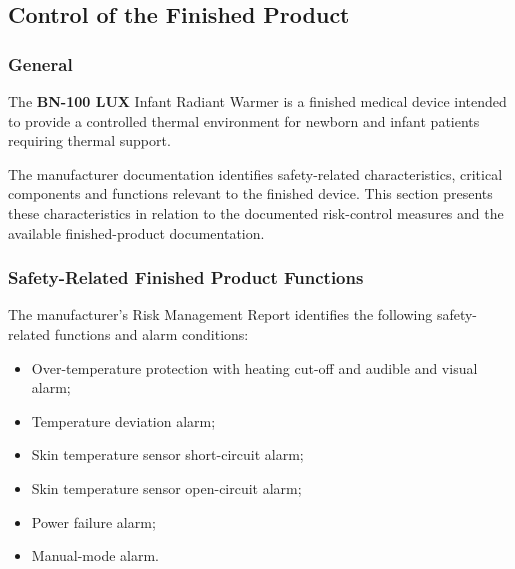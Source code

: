 
\hypertarget{p3-3-4}{}

\subsection{Control of the Finished Product}

\subsubsection{General}

The \textbf{BN-100 LUX} Infant Radiant Warmer is a finished
medical device intended to provide a controlled thermal
environment for newborn and infant patients requiring thermal
support.

The manufacturer documentation identifies safety-related
characteristics, critical components and functions relevant to
the finished device. This section presents these characteristics
in relation to the documented risk-control measures and the
available finished-product documentation.


\subsubsection{Safety-Related Finished Product Functions}

The manufacturer's Risk Management Report identifies the
following safety-related functions and alarm conditions:

\begin{itemize}
    \item Over-temperature protection with heating cut-off and
    audible and visual alarm;
    \item Temperature deviation alarm;
    \item Skin temperature sensor short-circuit alarm;
    \item Skin temperature sensor open-circuit alarm;
    \item Power failure alarm;
    \item Manual-mode alarm.
\end{itemize}

